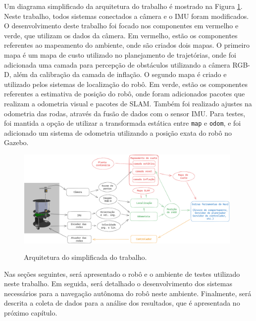 \documentclass[repeatfields,xlists,xpacks,oneside,yearsonly]{ufrgscca}
\begin{document}
Um diagrama simplificado da arquitetura do trabalho é mostrado na 
Figura \ref{fig:arq_trabalho}.
Neste trabalho, todos sistemas conectados a câmera e o IMU foram modificados.
O desenvolvimento deste trabalho foi focado nos componentes em vermelho 
e verde, que utilizam os dados da câmera.
Em vermelho, estão os componentes referentes ao mapeamento do ambiente,
onde são criados dois mapas.
O primeiro mapa é um mapa de custo utilizado no planejamento de trajetórias,
onde foi adicionada uma camada para percepção de obstáculos utilizando 
a câmera RGB-D, além da calibração da camada de inflação.
O segundo mapa é criado e utilizado pelos sistemas de localização do robô.
Em verde, estão os componentes referentes a estimativa de
posição do robô, onde foram adicionados pacotes que realizam a 
odometria visual e pacotes de SLAM.
Também foi realizado ajustes na odometria das rodas, através da fusão 
de dados com o sensor IMU.
Para testes, foi mantida a opção de utilizar a transformada estática entre
\texttt{map} e \texttt{odom}, e foi adicionado um sistema de odometria
utilizando a posição exata do robô no Gazebo.

\begin{figure}[h]
    {
        \centering
        \caption{Arquitetura do simplificada do trabalho.}
        \label{fig:arq_trabalho}
        \includegraphics[width=0.98\textwidth]{arquitetura_simplificadav3.png}\\
    }
\end{figure}

Nas seções seguintes, será apresentado o robô e o ambiente de testes
utilizado neste trabalho.
Em seguida, será detalhado o desenvolvimento dos sistemas necessários
para a navegação autônoma do robô neste ambiente.
Finalmente, será descrita a coleta de dados para a análise dos resultados,
que é apresentada no próximo capítulo.
\end{document}
